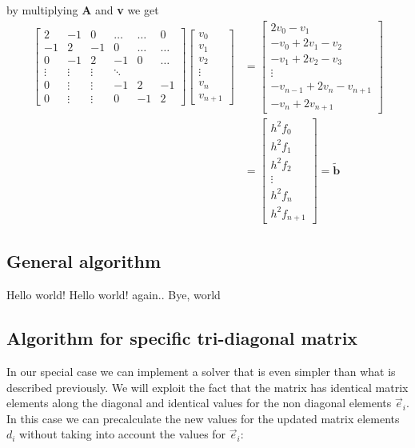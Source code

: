 \documentclass[norsk,a4paper,12pt]{article}
\begin{document}
by multiplying \textbf{A} and \textbf{v} we get \\
\begin{align*}
\begin{bmatrix} 2 & -1 & 0 & \dots & \dots & 0 \\ -1 & 2 & -1 & 0 & \dots & \dots \\ 0 & -1 & 2 & -1 & 0 & \dots \\ \vdots & \vdots & \vdots & \ddots \\ 0 & \vdots & \vdots & -1 & 2 & -1 \\ 0 & \vdots & \vdots & 0 & -1 & 2  \end{bmatrix}
\begin{bmatrix} v_0 \\ v_1\\ v_2\\ \vdots \\ v_n \\ v_{n+1} \end{bmatrix}&=\begin{bmatrix} 2v_0 - v_1 \\ -v_0+2v_1-v_2 \\ -v_1+2v_2-v_3 \\ \vdots \\ -v_{n-1}+2v_n-v_{n+1} \\ -v_n+2v_{n+1}
\end{bmatrix}\\&=
\begin{bmatrix}h^2f_0 \\ h^2f_1\\ h^2f_2\\ \vdots \\ h^2f_n\\ h^2f_{n+1}\end{bmatrix} = \widetilde{\textbf{b}}
\end{align*}

\subsection{General algorithm}

Hello world!
Hello world! again..
Bye, world
\\

\subsection{Algorithm for specific tri-diagonal matrix}

In our special case we can implement a solver that is even simpler than what is described previously.  We will exploit the fact that the matrix has identical matrix elements along the diagonal and identical values for the non diagonal elements $\vec{e}_i$. In this case we can precalculate the new values for the updated matrix elements $d_i$ without taking into account the values for $\vec{e}_i$:
\end{document}
